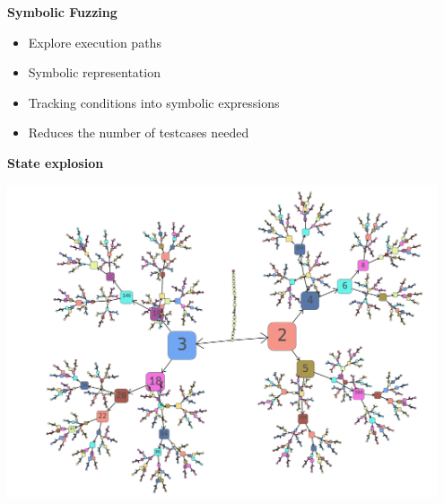 \begin{frame}
			\textbf{Symbolic Fuzzing}
	        \vspace{1.8mm}
			\small
			\begin{itemize}
				\item Explore execution paths
				\item Symbolic representation
				\item Tracking conditions into symbolic expressions
				\item Reduces the number of testcases needed
			\end{itemize}
\end{frame}

\begin{frame}
    \vspace{3.0mm}
    \textbf{State explosion}
    \begin{center}
        \includegraphics[width=0.95\textwidth]{assets/state-splitter-alpha.png}
    \end{center}
\end{frame}
